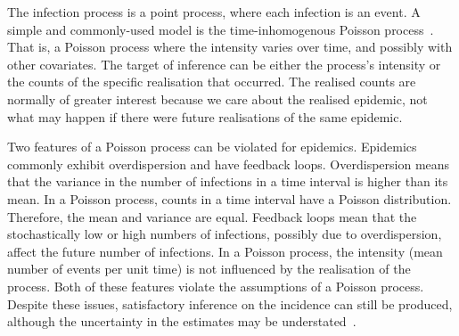 \documentclass[thesis.tex]{subfiles}
\begin{document}
The infection process is a point process, where each infection is an event.
A simple and commonly-used model is the time-inhomogenous Poisson process~\autocites{brookmeyerMethod}{paganoHIV}{rosenbergBackcalculation}{brookmeyerBackcalculation}.
That is, a Poisson process where the intensity varies over time, and possibly with other covariates.
The target of inference can be either the process's intensity or the counts of the specific realisation that occurred.
The realised counts are normally of greater interest because we care about the realised epidemic, not what may happen if there were future realisations of the same epidemic.

Two features of a Poisson process can be violated for epidemics.
Epidemics commonly exhibit overdispersion and have feedback loops.
Overdispersion means that the variance in the number of infections in a time interval is higher than its mean.
In a Poisson process, counts in a time interval have a Poisson distribution.
Therefore, the mean and variance are equal.
Feedback loops mean that the stochastically low or high numbers of infections, possibly due to overdispersion, affect the future number of infections.
In a Poisson process, the intensity (mean number of events per unit time) is not influenced by the realisation of the process.
Both of these features violate the assumptions of a Poisson process.
Despite these issues, satisfactory inference on the incidence can still be produced, although the uncertainty in the estimates may be understated~\autocite{beckerDependent}.
\end{document}

